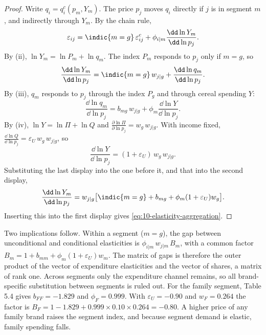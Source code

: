 \begin{proof}
Write $q_i = q_i^c(p_m, Y_m)$. The price $p_j$ moves $q_i$ directly if $j$ is in segment $m$, and indirectly
through $Y_m$. By the chain rule,
\begin{equation*}
  \varepsilon_{ij} = \indic\{m = g\}\,\varepsilon^c_{ij} + \phi_{i|m}\frac{\dd\ln Y_m}{\dd\ln p_j}.
\end{equation*}
By (ii), $\ln Y_m = \ln P_m + \ln q_m$. The index $P_m$ responds to $p_j$ only if $m = g$, so
\begin{equation*}
  \frac{\dd\ln Y_m}{\dd\ln p_j} = \indic\{m = g\}\,w_{j|g} + \frac{\dd\ln q_m}{\dd\ln p_j}.
\end{equation*}
By (iii), $q_m$ responds to $p_j$ through the index $P_g$ and through cereal spending $Y$:
\begin{equation*}
  \frac{\dd\ln q_m}{\dd\ln p_j} = b_{mg}\,w_{j|g} + \phi_m\frac{\dd\ln Y}{\dd\ln p_j}.
\end{equation*}
By (iv), $\ln Y = \ln\Pi + \ln Q$ and $\frac{\partial\ln\Pi}{\partial\ln p_j} = w_g\,w_{j|g}$. With income fixed,
$\frac{\dd\ln Q}{\dd\ln p_j} = \varepsilon_U\,w_g\,w_{j|g}$, so
\begin{equation*}
  \frac{\dd\ln Y}{\dd\ln p_j} = (1 + \varepsilon_U)\,w_g\,w_{j|g}.
\end{equation*}
Substituting the last display into the one before it, and that into the second display,
\begin{equation*}
  \frac{\dd\ln Y_m}{\dd\ln p_j} = w_{j|g}\bigl[\indic\{m = g\} + b_{mg} + \phi_m(1 + \varepsilon_U)w_g\bigr].
\end{equation*}
Inserting this into the first display gives \eqref{eq:10-elasticity-aggregation}.
\end{proof}

Two implications follow. Within a segment ($m = g$), the gap between unconditional and conditional
elasticities is $\phi_{i|m}\,w_{j|m}\,B_m$, with a common factor
$B_m = 1 + b_{mm} + \phi_m(1 + \varepsilon_U)w_m$. The matrix of gaps is therefore the outer product of the
vector of expenditure elasticities and the vector of shares, a matrix of rank one. Across segments only the
expenditure channel remains, so all brand-specific substitution between segments is ruled out. For the
family segment, Table 5.4 gives $b_{FF} = -1.829$ and $\phi_F = 0.999$. With $\varepsilon_U = -0.90$ and
$w_F = 0.264$ the factor is $B_F = 1 - 1.829 + 0.999 \times 0.10 \times 0.264 = -0.80$. A higher price of any
family brand raises the segment index, and because segment demand is elastic, family spending falls.


